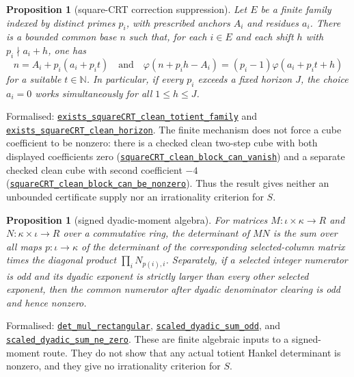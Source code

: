 \documentclass[11pt]{article}
\newcommand{\commit}{81150c1c6fdd4cd51e76d3aa0de344341e0e9e7c}
\newcommand{\repobase}{https://github.com/wcook04/plectis-lean-erdos249-257/blob/\commit}
\newcommand{\PK}{Erdos249257}
\newcommand{\lrefx}[3]{\href{\repobase/\PK/#1\#L#2}{\nolinkurl{#3}}}
\newtheorem{proposition}[theorem]{Proposition}
\theoremstyle{definition}
\theoremstyle{remark}
\newcommand{\N}{\mathbb{N}}
\newcommand{\ph}{\varphi}
\begin{document}
\begin{proposition}[square-CRT correction suppression]\label{res:squarecrt}
Let $E$ be a finite family indexed by distinct primes $p_i$, with prescribed
anchors $A_i$ and residues $a_i$.  There is a bounded common base $n$ such
that, for each $i\in E$ and each shift $h$ with $p_i\nmid a_i+h$, one has
\[
 n=A_i+p_i(a_i+p_i t)\quad\text{and}\quad
 \ph(n+p_i h-A_i)=(p_i-1)\ph(a_i+p_i t+h)
\]
for a suitable $t\in\N$.  In particular, if every $p_i$ exceeds a fixed
horizon $J$, the choice $a_i=0$ works simultaneously for all $1\le h\le J$.
\end{proposition}
\noindent Formalised:
\lrefx{SquareCRTCube.lean}{198}{exists_squareCRT_clean_totient_family}
and \lrefx{SquareCRTCube.lean}{228}{exists_squareCRT_clean_horizon}.
The finite mechanism does not force a cube coefficient to be nonzero: there
is a checked clean two-step cube with both displayed coefficients zero
(\lrefx{SquareCRTCube.lean}{285}{squareCRT_clean_block_can_vanish}) and a
separate checked clean cube with second coefficient $-4$
(\lrefx{SquareCRTCube.lean}{303}{squareCRT_clean_block_can_be_nonzero}).
Thus the result gives neither an unbounded certificate supply nor an
irrationality criterion for $S$.

\begin{proposition}[signed dyadic-moment algebra]\label{res:signedmoment}
For matrices $M:\iota\times\kappa\to R$ and
$N:\kappa\times\iota\to R$ over a commutative ring, the determinant of
$MN$ is the sum over all maps $p:\iota\to\kappa$ of the determinant of the
corresponding selected-column matrix times the diagonal product
$\prod_i N_{p(i),i}$.  Separately, if a selected integer numerator is odd and
its dyadic exponent is strictly larger than every other selected exponent,
then the common numerator after dyadic denominator clearing is odd and hence
nonzero.
\end{proposition}
\noindent Formalised:
\lrefx{SignedQMomentObstruction.lean}{28}{det_mul_rectangular},
\lrefx{SignedQMomentObstruction.lean}{77}{scaled_dyadic_sum_odd}, and
\lrefx{SignedQMomentObstruction.lean}{95}{scaled_dyadic_sum_ne_zero}.
These are finite algebraic inputs to a signed-moment route.  They do not show
that any actual totient Hankel determinant is nonzero, and they give no
irrationality criterion for $S$.
\end{document}
